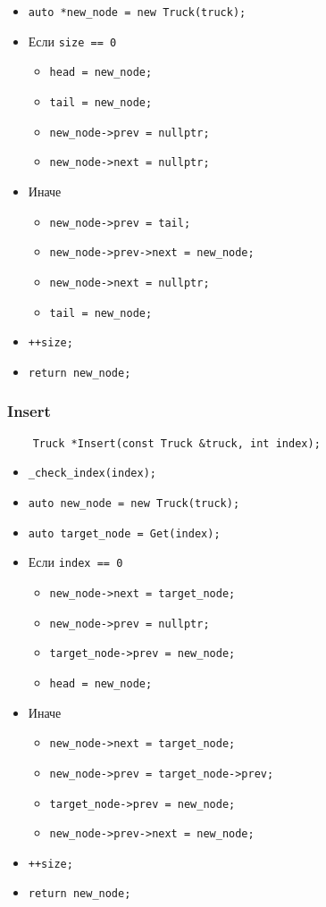 \begin{itemize}
	\item \verb|auto *new_node = new Truck(truck);|
	\item Если \verb|size == 0|
	\begin{itemize}
		\item \verb|head = new_node;|
		\item \verb|tail = new_node;|
		\item \verb|new_node->prev = nullptr;|
		\item \verb|new_node->next = nullptr;|
	\end{itemize}
	\item Иначе
	\begin{itemize}
		\item \verb|new_node->prev = tail;|
		\item \verb|new_node->prev->next = new_node;|
		\item \verb|new_node->next = nullptr;|
		\item \verb|tail = new_node;|
	\end{itemize}
	\item \verb|++size;|
	\item \verb|return new_node;|
\end{itemize}


\subsubsection*{Insert}

\begin{lstlisting}
    Truck *Insert(const Truck &truck, int index);
\end{lstlisting}

\begin{itemize}
	\item \verb|_check_index(index);|
    \item \verb|auto new_node = new Truck(truck);|
    \item \verb|auto target_node = Get(index);|
	\item Если \verb|index == 0|
		\begin{itemize}
			\item \verb|new_node->next = target_node;|
			\item \verb|new_node->prev = nullptr;|
			\item \verb|target_node->prev = new_node;|
			\item \verb|head = new_node;|
		\end{itemize}
	\item Иначе 
		\begin{itemize}
			\item \verb|new_node->next = target_node;|
			\item \verb|new_node->prev = target_node->prev;|
			\item \verb|target_node->prev = new_node;|
			\item \verb|new_node->prev->next = new_node;|
		\end{itemize}
	\item \verb|++size;|
	\item \verb|return new_node;|
\end{itemize}



